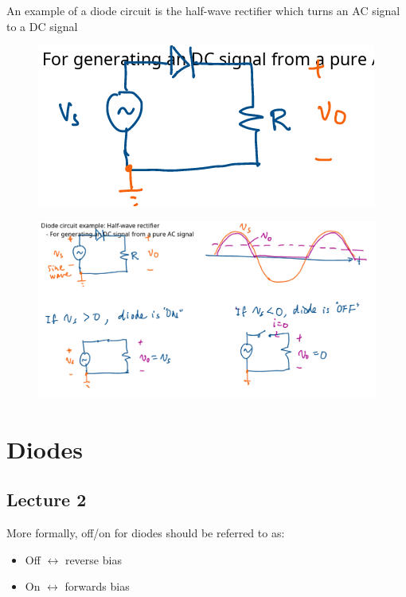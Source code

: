 \documentclass[../notes.tex]{subfiles}
\begin{document}
An example of a diode circuit is the half-wave rectifier which turns an AC signal to a DC signal 

\begin{figure}[H]
	\centering
	\includegraphics[width=0.8\linewidth]{img/image_2022-09-09-12-51-30.png}
\end{figure}

\begin{figure}[H]
	\centering
	\includegraphics[width=0.8\linewidth]{img/image_2022-09-09-13-01-02.png}
\end{figure}

\section{Diodes}

\subsection{Lecture 2}

More formally, off/on for diodes should be referred to as:
\begin{itemize}
	\item Off $ \leftrightarrow $ reverse bias
	\item On $ \leftrightarrow $ forwards bias
\end{itemize}
\end{document}
